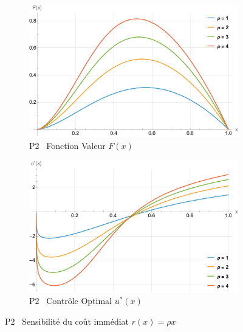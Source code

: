 \begin{figure}[htb]
    \centering
    \begin{subfigure}{0.45\linewidth}
        \includegraphics[width=\linewidth]{img/validation/P2/p2_R_value.pdf}
        \caption{P2 \textemdash~Fonction Valeur $F(x)$}\label{fig:RhoValueVisualisation2}
    \end{subfigure}
    \hfill
    \begin{subfigure}{0.45\linewidth}
        \includegraphics[width=\linewidth]{img/validation/P2/p2_R_control.pdf}
        \caption{P2 \textemdash~Contrôle Optimal $u^*(x)$}\label{fig:RhoControlVisualisation2}
    \end{subfigure}
    \caption{P2 \textemdash~Sensibilité du coût immédiat $r(x)=\rho x$}\label{fig:RhoValueControlComparison2}
\end{figure}

